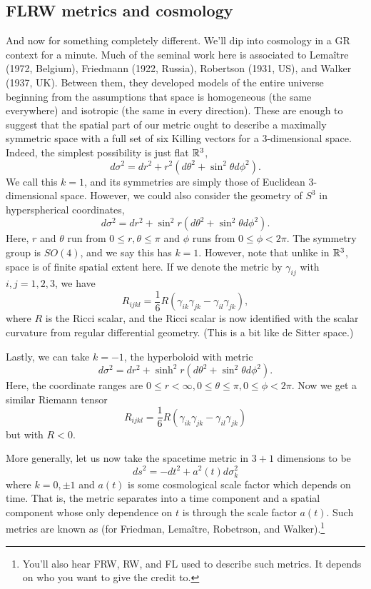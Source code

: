 \subsection*{FLRW metrics and cosmology} And now for something completely different. We'll dip into cosmology in a GR context for a minute. Much of the seminal work here is associated to Lema\^itre (1972, Belgium), Friedmann (1922, Russia), Robertson (1931, US), and Walker (1937, UK). Between them, they developed models of the entire universe beginning from the assumptions that space is homogeneous (the same everywhere) and isotropic (the same in every direction). These are enough to suggest that the spatial part of our metric ought to describe a maximally symmetric space with a full set of six Killing vectors for a 3-dimensional space. Indeed, the simplest possibility is just flat $\mathbb{R}^3$,
$$d\sigma^2=dr^2+r^2(d\theta^2+\sin^2\theta d\phi^2).$$
We call this $k=1$, and its symmetries are simply those of Euclidean 3-dimensional space. However, we could also consider the geometry of $S^3$ in hyperspherical coordinates,
$$d\sigma^2=dr^2+\sin^2 r(d\theta^2+\sin^2\theta d\phi^2).$$ Here, $r$ and $\theta$ run from $0\leq r,\theta\leq \pi$ and $\phi$ runs from $0\leq \phi < 2\pi$. The symmetry group is $SO(4)$, and we say this has $k=1$. However, note that unlike in $\mathbb{R}^3$, space is of finite spatial extent here. If we denote the metric by $\gamma_{ij}$ with $i,j=1,2,3$, we have
$$R_{ijkl}=\frac{1}{6}R(\gamma_{ik}\gamma_{jk}-\gamma_{il}\gamma_{jk}),$$
where $R$ is the Ricci scalar, and the Ricci scalar is now identified with the scalar curvature from regular differential geometry. (This is a bit like de Sitter space.)

Lastly, we can take $k=-1$, the hyperboloid with metric $$d\sigma^2=dr^2+\sinh^2 r (d\theta^2 +\sin^2\theta d\phi^2).$$
Here, the coordinate ranges are $0\leq r < \infty, 0\leq \theta \leq \pi, 0\leq \phi < 2\pi.$ Now we get a similar Riemann tensor
$$R_{ijkl}=\frac{1}{6}R(\gamma_{ik}\gamma_{jk}-\gamma_{il}\gamma_{jk})$$
but with $R<0.$

\begin{defn}
More generally, let us now take the spacetime metric in $3+1$ dimensions to be
$$ds^2=-dt^2+a^2(t) d\sigma_k^2$$
where $k=0,\pm 1$ and $a(t)$ is some cosmological scale factor which depends on time. That is, the metric separates into a time component and a spatial component whose only dependence on $t$ is through the scale factor $a(t)$. Such metrics are known as  (for Friedman, Lema\^itre, Robetrson, and Walker).\footnote{You'll also hear FRW, RW, and FL used to describe such metrics. It depends on who you want to give the credit to.}
\end{defn}

